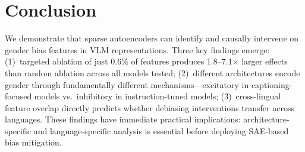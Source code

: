 \documentclass[11pt,a4paper]{article}
\newcommand{\sae}{SAE}
\begin{document}
\section{Conclusion}
\label{sec:conclusion}

We demonstrate that sparse autoencoders can identify and causally intervene on gender bias features in VLM representations.
Three key findings emerge: (1)~targeted ablation of just 0.6\% of features produces 1.8--7.1$\times$ larger effects than random ablation across all models tested; (2)~different architectures encode gender through fundamentally different mechanisms---excitatory in captioning-focused models vs.\ inhibitory in instruction-tuned models; (3)~cross-lingual feature overlap directly predicts whether debiasing interventions transfer across languages.
These findings have immediate practical implications: architecture-specific and language-specific analysis is essential before deploying \sae{}-based bias mitigation.


\end{document}
